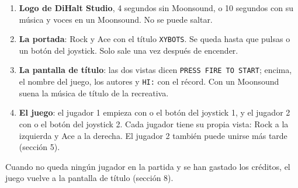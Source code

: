 \begin{enumerate}
\item \textbf{Logo de DiHalt Studio}, 4 segundos sin Moonsound, o 10 segundos con su música y voces en un Moonsound. No se puede saltar.
\item \textbf{La portada}: Rock y Ace con el título \texttt{XYBOTS}. Se queda hasta que pulsas  o un botón del joystick. Solo sale una vez después de encender.
\item \textbf{La pantalla de título}: las dos vistas dicen \texttt{PRESS FIRE TO START}; encima, el nombre del juego, los autores y \texttt{HI:} con el récord. Con un Moonsound suena la música de título de la recreativa.
\item \textbf{El juego}: el jugador 1 empieza con  o el botón del joystick 1, y el jugador 2 con  o el botón del joystick 2. Cada jugador tiene su propia vista: Rock a la izquierda y Ace a la derecha. El jugador 2 también puede unirse más tarde (sección 5).
\end{enumerate}
Cuando no queda ningún jugador en la partida y se han gastado los créditos, el juego vuelve a la pantalla de título (sección 8).
